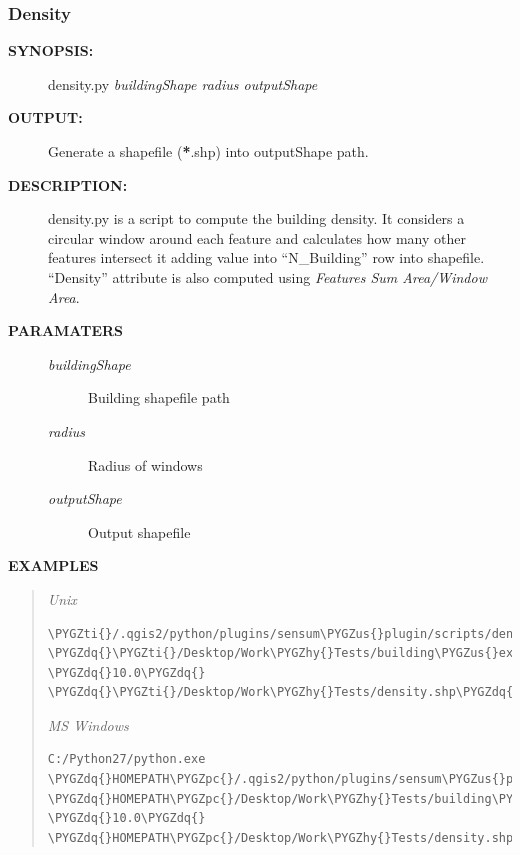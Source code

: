 \documentclass[letterpaper,10pt,english]{sphinxmanual}
\def\PYGZus{\char`\_}
\def\PYGZpc{\char`\%}
\def\PYGZhy{\char`\-}
\def\PYGZdq{\char`\"}
\def\PYGZti{\char`\~}
\begin{document}
\subsubsection{Density}
\label{user:density}\begin{description}
\item[{\textbf{SYNOPSIS:}}] \leavevmode
density.py \emph{buildingShape radius outputShape}

\item[{\textbf{OUTPUT:}}] \leavevmode
Generate a shapefile ({\color{red}\bfseries{}*}.shp) into outputShape path.

\item[{\textbf{DESCRIPTION:}}] \leavevmode
density.py is a script to compute the building density. It considers a circular window around each feature and calculates how many other features intersect it adding value into ``N\_Building'' row into shapefile. ``Density'' attribute is also computed using \emph{Features Sum Area/Window Area}.

\item[{\textbf{PARAMATERS}}] \leavevmode\begin{description}
\item[{\emph{buildingShape}}] \leavevmode
Building shapefile path

\item[{\emph{radius}}] \leavevmode
Radius of windows

\item[{\emph{outputShape}}] \leavevmode
Output shapefile

\end{description}

\end{description}

\textbf{EXAMPLES}
\begin{quote}

\emph{Unix}

\begin{Verbatim}[frame=single,commandchars=\\\{\}]
\PYGZti{}/.qgis2/python/plugins/sensum\PYGZus{}plugin/scripts/density.py \PYGZdq{}\PYGZti{}/Desktop/Work\PYGZhy{}Tests/building\PYGZus{}extraction.shp\PYGZdq{} \PYGZdq{}10.0\PYGZdq{} \PYGZdq{}\PYGZti{}/Desktop/Work\PYGZhy{}Tests/density.shp\PYGZdq{}
\end{Verbatim}

\emph{MS Windows}

\begin{Verbatim}[frame=single,commandchars=\\\{\}]
C:/Python27/python.exe \PYGZdq{}HOMEPATH\PYGZpc{}/.qgis2/python/plugins/sensum\PYGZus{}plugin/scripts/density.py\PYGZdq{} \PYGZdq{}HOMEPATH\PYGZpc{}/Desktop/Work\PYGZhy{}Tests/building\PYGZus{}extraction.shp\PYGZdq{} \PYGZdq{}10.0\PYGZdq{} \PYGZdq{}HOMEPATH\PYGZpc{}/Desktop/Work\PYGZhy{}Tests/density.shp\PYGZdq{}
\end{Verbatim}
\end{quote}
\end{document}
